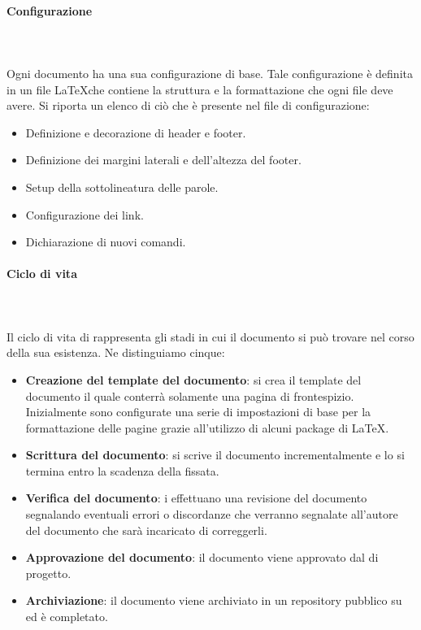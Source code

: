 \documentclass[../norme-di-progetto.tex]{subfiles}
\begin{document}
\paragraph{Configurazione} \mbox{}\\
\label{par:configurazione}
\\Ogni documento ha una sua configurazione di base. Tale configurazione è definita in un file \LaTeX  che contiene la struttura e la formattazione che ogni file deve avere. Si riporta un elenco di ciò che è presente nel file di configurazione:
\begin{itemize}
	\item Definizione e decorazione di header e footer.
	\item Definizione dei margini laterali e dell'altezza del footer.
	\item Setup della sottolineatura delle parole.
	\item Configurazione dei link.
	\item Dichiarazione di nuovi comandi.
\end{itemize}
\paragraph{Ciclo di vita}\mbox{}\\
\label{par:ciclo di vita}
\\Il ciclo di vita di rappresenta gli stadi in cui il documento si può trovare nel corso della sua esistenza. Ne distinguiamo cinque:
\begin{itemize}
	\item \textbf{Creazione del template del documento}: si crea il template del documento il quale conterrà solamente una pagina di frontespizio. Inizialmente sono configurate una serie di impostazioni di base per la formattazione delle pagine grazie all'utilizzo di alcuni package di \LaTeX.
	\item \textbf{Scrittura del documento}: si scrive il documento incrementalmente e lo si termina entro la scadenza della  fissata.
	\item \textbf{Verifica del documento}: i  effettuano una revisione del documento segnalando eventuali errori o discordanze che verranno segnalate all'autore del documento che sarà incaricato di correggerli.
	\item \textbf{Approvazione del documento}: il documento viene approvato dal  di progetto.
	\item \textbf{Archiviazione}: il documento viene archiviato in un repository pubblico su  ed è completato.
\end{itemize}
\end{document}
